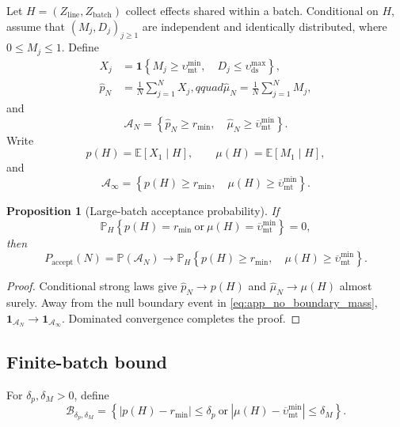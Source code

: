 \documentclass[pdflatex,sn-mathphys-num]{sn-jnl}
\numberwithin{equation}{section}
\theoremstyle{thmstyleone}%
\newtheorem{proposition}[theorem]{Proposition}
\theoremstyle{definition}
\theoremstyle{remark}
\begin{document}
\begin{appendices}
Let $H=(Z_{\mathrm{line}},Z_{\mathrm{batch}})$ collect effects shared within a
batch. Conditional on $H$, assume that $(M_j,D_j)_{j\geq1}$ are independent
and identically distributed, where $0\leq M_j\leq1$. Define
\begin{align}
X_j&=\mathbf1\!\left\{M_j\geq\upsilon_{\mathrm{mt}}^{\min},\quad
D_j\leq\upsilon_{\mathrm{ds}}^{\max}\right\},\nonumber\\
\widehat p_N&=\frac1N\sum_{j=1}^NX_j,qquad
\widehat\mu_N=\frac1N\sum_{j=1}^NM_j,
\label{eq:app_empirical_acceptance}
\end{align}
and
\[
\mathcal A_N=\left\{\widehat p_N\geq r_{\min},\quad
\widehat\mu_N\geq\overline\upsilon_{\mathrm{mt}}^{\min}\right\}.
\]
Write
\[
p(H)=\mathbb E[X_1\mid H],\qquad
\mu(H)=\mathbb E[M_1\mid H],
\]
and
\[
\mathcal A_\infty=\left\{p(H)\geq r_{\min},\quad
\mu(H)\geq\overline\upsilon_{\mathrm{mt}}^{\min}\right\}.
\]

\begin{proposition}[Large-batch acceptance probability]
\label{prop:app_large_batch}
If
\begin{equation}
\mathbb P_H\!\left\{p(H)=r_{\min}\ \text{or}\
\mu(H)=\overline\upsilon_{\mathrm{mt}}^{\min}\right\}=0,
\label{eq:app_no_boundary_mass}
\end{equation}
then
\begin{equation}
P_{\mathrm{accept}}(N)=\mathbb P(\mathcal A_N)
\longrightarrow
\mathbb P_H\!\left\{p(H)\geq r_{\min},\quad
\mu(H)\geq\overline\upsilon_{\mathrm{mt}}^{\min}\right\}.
\label{eq:app_large_batch_limit}
\end{equation}
\end{proposition}

\begin{proof}
Conditional strong laws give
$\widehat p_N\to p(H)$ and $\widehat\mu_N\to\mu(H)$ almost surely. Away
from the null boundary event in \eqref{eq:app_no_boundary_mass},
$\mathbf1_{\mathcal A_N}\to\mathbf1_{\mathcal A_\infty}$. Dominated
convergence completes the proof.
\end{proof}

\subsection{Finite-batch bound}

For $\delta_p,\delta_M>0$, define
\begin{equation}
\mathcal B_{\delta_p,\delta_M}=
\left\{|p(H)-r_{\min}|\leq\delta_p\ \text{or}\
|\mu(H)-\overline\upsilon_{\mathrm{mt}}^{\min}|\leq\delta_M\right\}.
\label{eq:app_margin_event}
\end{equation}


\end{appendices}
\end{document}
